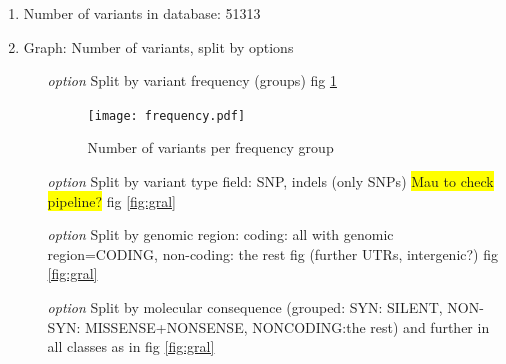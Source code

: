 \documentclass[a4paper, 10pt]{article}        %
\begin{document}
\begin{enumerate}
\item Number of variants in database: 51313
\item Graph: Number of variants, split by options %
\begin{itemize}
\item[\textsl{option}] Split by variant frequency (groups) fig \ref{fig:freq}
     \begin{figure}[!h]
     \centering
      \texttt{[image: frequency.pdf]} 
  \caption{Number of variants per frequency group}
\label{fig:freq}
     \end{figure}
\item[\textsl{option}] Split by variant type field: SNP, indels (only SNPs) \colorbox{yellow}{Mau to check pipeline?} fig \ref{fig:gral}
\item[\textsl{option}] Split by genomic region: coding: all with genomic region=CODING, non-coding: the rest fig (further UTRs, intergenic?) fig \ref{fig:gral}
\item[\textsl{option}] Split by molecular consequence (grouped: SYN: SILENT, NON-SYN: MISSENSE+NONSENSE, NONCODING:the rest) and further in all classes as in fig \ref{fig:gral} 


\end{itemize}
\end{enumerate}
\end{document}
